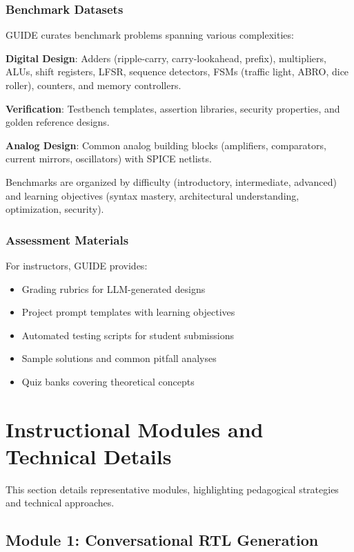 \documentclass[10pt,conference]{IEEEtran}
\begin{document}
\subsubsection{Benchmark Datasets}

GUIDE curates benchmark problems spanning various complexities:

\textbf{Digital Design}: Adders (ripple-carry, carry-lookahead, prefix), multipliers, ALUs, shift registers, LFSR, sequence detectors, FSMs (traffic light, ABRO, dice roller), counters, and memory controllers.

\textbf{Verification}: Testbench templates, assertion libraries, security properties, and golden reference designs.

\textbf{Analog Design}: Common analog building blocks (amplifiers, comparators, current mirrors, oscillators) with SPICE netlists.

Benchmarks are organized by difficulty (introductory, intermediate, advanced) and learning objectives (syntax mastery, architectural understanding, optimization, security).

\subsubsection{Assessment Materials}

For instructors, GUIDE provides:
\begin{itemize}
    \item Grading rubrics for LLM-generated designs
    \item Project prompt templates with learning objectives
    \item Automated testing scripts for student submissions
    \item Sample solutions and common pitfall analyses
    \item Quiz banks covering theoretical concepts
\end{itemize}

\section{Instructional Modules and Technical Details}
\label{sec:modules}

This section details representative modules, highlighting pedagogical strategies and technical approaches.

\subsection{Module 1: Conversational RTL Generation}
\end{document}
